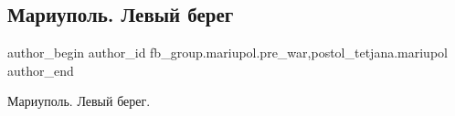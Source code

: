  
 
 
 
 

\subsection{Мариуполь. Левый берег}
\label{sec:09_02_2023.fb.fb_group.mariupol.pre_war.5.mariupol__levii_bere}
 
\ifcmt
 author_begin
   author_id fb_group.mariupol.pre_war,postol_tetjana.mariupol
 author_end
\fi

Мариуполь. Левый берег.

